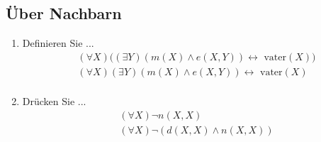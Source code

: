 \subsection{Über Nachbarn}
\begin{enumerate}
	\item Definieren Sie ...
	\begin{align*}
		&(\forall X)\Big((\exists Y)(m(X)\wedge e(X,Y))\leftrightarrow \text{ vater}(X)\Big)\\
		&(\forall X)(\exists Y)(m(X)\wedge e(X,Y))\leftrightarrow \text{ vater}(X)\\
	\end{align*}
	\item Drücken Sie ...
	\begin{align*}
	&(\forall X)\neg n(X,X)\\
	&(\forall X)\neg (d(X,X) \wedge n(X,X))
	\end{align*}
\end{enumerate}